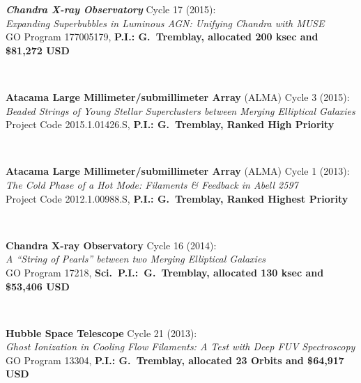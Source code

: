 \documentclass[11pt]{article}
\begin{document}
\vspace{4mm}

\hspace{42mm} \parbox{5.15in}{\textbf{\textit{Chandra X-ray Observatory}} Cycle 17 (2015): \\ \textit{Expanding Superbubbles in Luminous AGN: Unifying Chandra with MUSE} \\  GO Program 177005179, \textbf{P.I.: G.~Tremblay, allocated 200 ksec and \$81,272 USD}} \\


\vspace{4mm}

\hspace{42mm} \parbox{5.15in}{\textbf{Atacama Large Millimeter/submillimeter Array} (ALMA) Cycle 3 (2015): \\ \textit{Beaded Strings of Young Stellar Superclusters between Merging Elliptical Galaxies} \\  Project Code 2015.1.01426.S, \textbf{P.I.: G.~Tremblay, Ranked High Priority}} \\


\vspace{4mm}


\hspace{42mm} \parbox{5.15in}{\textbf{Atacama Large Millimeter/submillimeter Array} (ALMA) Cycle 1 (2013): \\ \textit{The Cold Phase of a Hot Mode: Filaments
\& Feedback in Abell 2597} \\  Project Code 2012.1.00988.S, \textbf{P.I.: G.~Tremblay, Ranked Highest Priority}} \\




\vspace{4mm}

\hspace{42mm} \parbox{5.15in}{\textbf{Chandra X-ray Observatory} Cycle 16 (2014): \\ \textit{A ``String of Pearls'' between two Merging
Elliptical Galaxies} \\ GO Program 17218, \textbf{Sci.~P.I.:~G.~Tremblay, allocated 130 ksec and \$53,406 USD}}\\

\vspace{4mm}


\hspace{42mm} \parbox{5.15in}{\textbf{Hubble Space Telescope} Cycle 21 (2013): \\ \textit{Ghost Ionization in Cooling Flow Filaments: A Test with Deep FUV Spectroscopy} \\ GO Program 13304, \textbf{P.I.: G.~Tremblay, allocated 23 Orbits and \$64,917 USD}}\\
\end{document}
